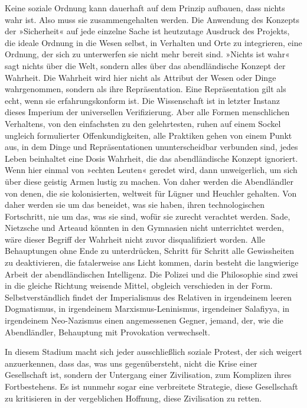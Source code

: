 Keine soziale Ordnung kann dauerhaft auf dem Prinzip aufbauen, dass
nichts wahr ist. Also muss sie zusammengehalten werden. Die
Anwendung des Konzepts der »Sicherheit« auf jede einzelne Sache ist
heutzutage Ausdruck des Projekts, die ideale Ordnung in die Wesen
selbst, in Verhalten und Orte zu integrieren, eine Ordnung, der
sich zu unterwerfen sie nicht mehr bereit sind. »Nichts ist wahr«
sagt nichts über die Welt, sondern alles über das abendländische
Konzept der Wahrheit. Die Wahrheit wird hier nicht als Attribut der
Wesen oder Dinge wahrgenommen, sondern als ihre Repräsentation.
Eine Repräsentation gilt als echt, wenn sie erfahrungskonform ist.
Die Wissenschaft ist in letzter Instanz dieses Imperium der
universellen Verifizierung. Aber alle Formen menschlichen
Verhaltens, von den einfachsten zu den gelehrtesten, ruhen auf
einem Sockel ungleich formulierter Offenkundigkeiten, alle
Praktiken gehen von einem Punkt aus, in dem Dinge und
Repräsentationen ununterscheidbar verbunden sind, jedes Leben
beinhaltet eine Dosis Wahrheit, die das abendländische Konzept
ignoriert. Wenn hier einmal von »echten Leuten« geredet wird, dann
unweigerlich, um sich über diese geistig Armen lustig zu machen.
Von daher werden die Abendländler von denen, die sie kolonisierten,
weltweit für Lügner und Heuchler gehalten. Von daher werden sie um
das beneidet, was sie haben, ihren technologischen Fortschritt, nie
um das, was sie sind, wofür sie zurecht verachtet werden. Sade,
Nietzsche und Arteaud könnten in den Gymnasien nicht unterrichtet
werden, wäre dieser Begriff der Wahrheit nicht zuvor
disqualifiziert worden. Alle Behauptungen ohne Ende zu
unterdrücken, Schritt für Schritt alle Gewissheiten zu
deaktivieren, die fatalerweise ans Licht kommen, darin besteht die
langwierige Arbeit der abendländischen Intelligenz. Die Polizei und
die Philosophie sind zwei in die gleiche Richtung weisende Mittel,
obgleich verschieden in der Form.
Selbstverständlich findet der Imperialismus des Relativen in
irgendeinem leeren Dogmatismus, in irgendeinem
Marxismus-Leninismus, irgendeiner Salafiyya, in irgendeinem
Neo-Nazismus einen angemessenen Gegner, jemand, der, wie die
Abendländler, Behauptung mit Provokation verwechselt.

\extrapar{}

In diesem Stadium macht sich jeder ausschließlich soziale Protest,
der sich weigert anzuerkennen, dass das, was uns gegenübersteht,
nicht die Krise einer Gesellschaft ist, sondern der Untergang einer
Zivilisation, zum Komplizen ihres Fortbestehens. Es ist nunmehr
sogar eine verbreitete Strategie, diese Gesellschaft zu kritisieren
in der vergeblichen Hoffnung, diese Zivilisation zu retten.
\extrapar{}

